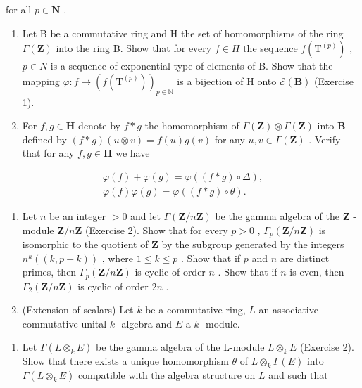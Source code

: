 for all \(p \in \mathbf{N}\) .

\begin{enumerate}
\def\labelenumi{\alph{enumi})}
\setcounter{enumi}{1}
\item
  Let B be a commutative ring and H the set of homomorphisms of the ring \(\Gamma(\mathbf{Z})\) into the ring B. Show that for every \(f \in H\) the sequence \(f(\mathrm{T}^{(p)})\) , \(p \in N\) is a sequence of exponential type of elements of B. Show that the mapping \(\varphi: f \mapsto (f(\mathrm{T}^{(p)}))_{p \in \mathbb{N}}\) is a bijection of H onto \(\mathcal{E}(\mathbf{B})\) (Exercise 1).
\item
  For \(f, g \in \mathbf{H}\) denote by \(f * g\) the homomorphism of \(\Gamma(\mathbf{Z}) \otimes \Gamma(\mathbf{Z})\) into \(\mathbf{B}\) defined by \((f * g)(u \otimes v) = f(u)g(v)\) for any \(u, v \in \Gamma(\mathbf{Z})\) . Verify that for any \(f, g \in \mathbf{H}\) we have
\end{enumerate}

\[
\begin{array}{c} \varphi (f) + \varphi (g) = \varphi ((f * g) \circ \Delta), \\ \varphi (f) \varphi (g) = \varphi ((f * g) \circ \theta). \end{array}
\]

\begin{enumerate}
\def\labelenumi{\arabic{enumi})}
\setcounter{enumi}{5}
\item
  Let \(n\) be an integer \(> 0\) and let \(\Gamma(\mathbf{Z}/n\mathbf{Z})\) be the gamma algebra of the \(\mathbf{Z}\) -module \(\mathbf{Z}/n\mathbf{Z}\) (Exercise 2). Show that for every \(p > 0\) , \(\Gamma_p(\mathbf{Z}/n\mathbf{Z})\) is isomorphic to the quotient of \(\mathbf{Z}\) by the subgroup generated by the integers \(n^k((k, p - k))\) , where \(1 \leqslant k \leqslant p\) . Show that if \(p\) and \(n\) are distinct primes, then \(\Gamma_p(\mathbf{Z}/n\mathbf{Z})\) is cyclic of order \(n\) . Show that if \(n\) is even, then \(\Gamma_2(\mathbf{Z}/n\mathbf{Z})\) is cyclic of order \(2n\) .
\item
  (Extension of scalars) Let \(k\) be a commutative ring, \(L\) an associative commutative unital \(k\) -algebra and \(E\) a \(k\) -module.
\end{enumerate}

\begin{enumerate}
\def\labelenumi{\alph{enumi})}
\tightlist
\item
  Let \(\Gamma(L \otimes_k E)\) be the gamma algebra of the L-module \(L \otimes_k E\) (Exercise 2). Show that there exists a unique homomorphism \(\theta\) of \(L \otimes_k \Gamma(E)\) into \(\Gamma(L \otimes_k E)\) compatible with the algebra structure on \(L\) and such that
\end{enumerate}

